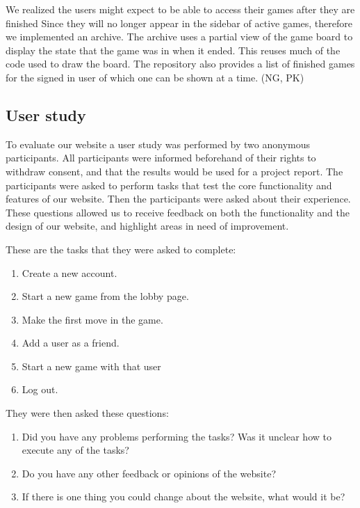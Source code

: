 \documentclass[acmlarge, review=false, screen=true]{acmart}
\begin{document}
    We realized the users might expect to be able to access their games after they are finished Since they will no longer appear in the sidebar of active games, therefore we implemented an archive. The archive uses a partial view of the game board to display the state that the game was in when it ended. This reuses much of the code used to draw the board. The repository also provides a list of finished games for the signed in user of which one can be shown at a time. (NG, PK)



  \subsection{User study}
    To evaluate our website a user study was performed by two anonymous participants. All participants were informed beforehand of their rights to withdraw consent, and that the results would be used for a project report. The participants were asked to perform tasks that test the core functionality and features of our website. Then the participants were asked about their experience. These questions allowed us to receive feedback on both the functionality and the design of our website, and highlight areas in need of improvement. 

    These are the tasks that they were asked to complete:
    \begin{enumerate}
      \item Create a new account.
      \item Start a new game from the lobby page.
      \item Make the first move in the game.
      \item Add a user as a friend.
      \item Start a new game with that user 
      \item Log out.
    \end{enumerate}

    They were then asked these questions:
    \begin{enumerate}
      \item Did you have any problems performing the tasks? Was it unclear how to execute any of the tasks?
      \item Do you have any other feedback or opinions of the website?
      \item If there is one thing you could change about the website, what would it be?
    \end{enumerate}
\end{document}
